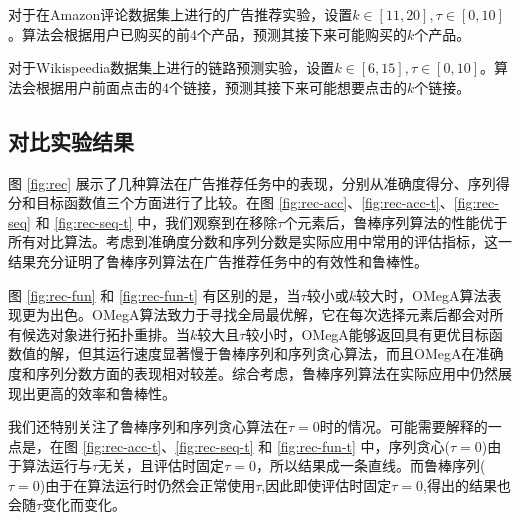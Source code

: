 对于在Amazon评论数据集上进行的广告推荐实验，设置$k\in[11,20],\tau \in[0,10]$。算法会根据用户已购买的前$4$个产品，预测其接下来可能购买的$k$个产品。

对于Wikispeedia数据集上进行的链路预测实验，设置$k\in[6,15],\tau \in[0,10]$。算法会根据用户前面点击的$4$个链接，预测其接下来可能想要点击的$k$个链接。


\subsection{对比实验结果}

图 \ref{fig:rec} 展示了几种算法在广告推荐任务中的表现，分别从准确度得分、序列得分和目标函数值三个方面进行了比较。在图 \ref{fig:rec-acc}、\ref{fig:rec-acc-t}、\ref{fig:rec-seq} 和 \ref{fig:rec-seq-t} 中，我们观察到在移除$\tau$个元素后，鲁棒序列算法的性能优于所有对比算法。考虑到准确度分数和序列分数是实际应用中常用的评估指标，这一结果充分证明了鲁棒序列算法在广告推荐任务中的有效性和鲁棒性。

图 \ref{fig:rec-fun} 和 \ref{fig:rec-fun-t} 有区别的是，当$\tau$较小或$k$较大时，OMegA算法表现更为出色。OMegA算法致力于寻找全局最优解，它在每次选择元素后都会对所有候选对象进行拓扑重排。当$k$较大且$\tau$较小时，OMegA能够返回具有更优目标函数值的解，但其运行速度显著慢于鲁棒序列和序列贪心算法，而且OMegA在准确度和序列分数方面的表现相对较差。综合考虑，鲁棒序列算法在实际应用中仍然展现出更高的效率和鲁棒性。

我们还特别关注了鲁棒序列和序列贪心算法在$\tau=0$时的情况。可能需要解释的一点是，在图 \ref{fig:rec-acc-t}、\ref{fig:rec-seq-t} 和 \ref{fig:rec-fun-t} 中，序列贪心($\tau=0$)由于算法运行与$\tau$无关，且评估时固定$\tau=0$，所以结果成一条直线。而鲁棒序列($\tau=0$)由于在算法运行时仍然会正常使用$\tau$,因此即使评估时固定$\tau=0$,得出的结果也会随$\tau$变化而变化。

